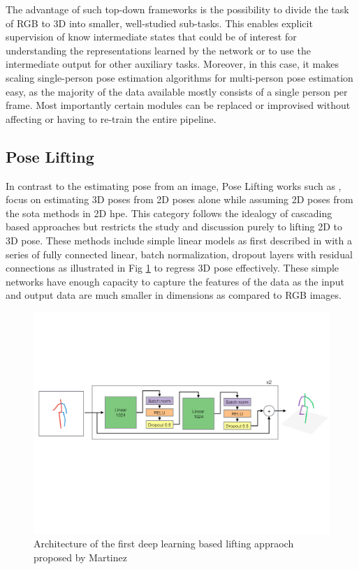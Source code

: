 The advantage of such top-down frameworks is the possibility to divide the task of RGB to 3D into smaller, well-studied sub-tasks. This enables explicit supervision of know intermediate states that could be of interest for understanding the representations learned by the network or to use the intermediate output for other auxiliary tasks. Moreover, in this case, it makes scaling single-person pose estimation algorithms for multi-person pose estimation easy, as the majority of the data available mostly consists of a single person per frame. Most importantly certain modules can be replaced or improvised without affecting or having to re-train the entire pipeline.

\subsection{Pose Lifting}

In contrast to the estimating pose from an image, Pose Lifting works such as \cite{poselifter,  amazon1, repnet, c3dpo, unsupervisedAdversarial}, focus on estimating 3D poses from 2D poses alone while assuming 2D poses from the \ac{sota} methods in 2D \ac{hpe}. This category follows the idealogy of cascading based approaches but restricts the study and discussion purely to lifting 2D to 3D pose. These methods include simple linear models as first described in \cite{MartinezHRL17} with a series of fully connected linear, batch normalization, dropout layers with residual connections as illustrated in Fig \ref{fig:lifting_arch} to regress 3D pose effectively. These simple networks have enough capacity to capture the features of the data as the input and output data are much smaller in dimensions as compared to RGB images.

\begin{figure}[h]
    \centering
    \includegraphics[width=\linewidth]{figures/background/lifting_arch.pdf}
    \caption{Architecture of the first deep learning based lifting appraoch proposed by Martinez \etal \cite{MartinezHRL17}}
    \label{fig:lifting_arch}
\end{figure}

